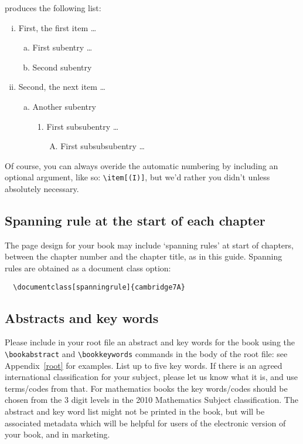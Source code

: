 produces the following list:
  \begin{enumerate}[(ii)]
    \item First, the first item \ldots
      \begin{enumerate}[(b)]
        \item First subentry \ldots
        \item Second subentry
      \end{enumerate}
    \item Second, the next item \ldots
      \begin{enumerate}[(b)]
        \item Another subentry
          \begin{enumerate}[(1)]
            \item First subsubentry \ldots
              \begin{enumerate}[(A)]
                \item First subsubsubentry \ldots
              \end{enumerate}
          \end{enumerate}
      \end{enumerate}
  \end{enumerate}

Of course, you can always overide the automatic numbering by including an optional argument, like so: \verb"\item[(I)]", but we'd rather you didn't unless absolutely necessary.

\subsection{Spanning rule at the start of each chapter}
The page design for your book may include `spanning rules' at
start of chapters, between the chapter number and the chapter
title, as in this guide. Spanning rules are obtained as a document class option:
\begin{verbatim}
  \documentclass[spanningrule]{cambridge7A}
\end{verbatim}

\subsection{Abstracts and key words}
Please include in your root file an abstract and key words for the book
using the \verb"\bookabstract" and \verb"\bookkeywords" commands in the body
of the root file: see Appendix~\ref{root} for examples. List up to five key words.
If there is an agreed international classification for your subject, please let us know what it is, and use terms/codes from that. For mathematics books the key words/codes
should be chosen from the 3 digit levels in the 2010 Mathematics Subject classification.
The abstract and key word list might not be printed in the book, but will be associated metadata which will be helpful for users of the electronic version of your book, and in marketing.

